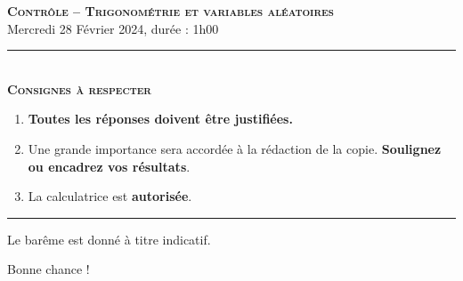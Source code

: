 \documentclass[11pt]{article}
\begin{document}
%
%
%
%
%

\begin{center}
\textbf{\LARGE \textsc{Contrôle -- Trigonométrie et variables aléatoires}}\\[2mm]

{\large Mercredi 28 Février 2024, durée : 1h00}\\[1mm]
\noindent\rule{8cm}{0.4pt}\\[1mm]
\textbf{\textsc{Consignes à respecter}}
\begin{enumerate}[label=\textbf{\arabic*/}]
\item \textbf{Toutes les réponses doivent être justifiées.}
\item Une grande importance sera accordée à la rédaction de la
  copie. \textbf{Soulignez ou encadrez vos résultats}.
\item La calculatrice est \textbf{autorisée}.
    \end{enumerate}
\noindent\rule{12cm}{0.4pt}
\end{center}

\noindent Le barême est donné à titre indicatif.
\begin{center}
  Bonne chance !
\end{center}
\end{document}
